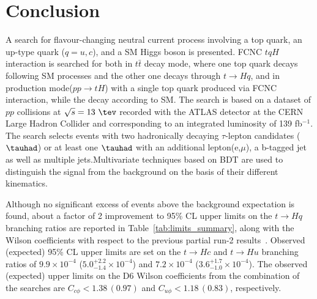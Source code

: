 \section{Conclusion}
\label{sec:conclusion}
A search for flavour-changing neutral current process involving a top quark, an up-type quark ($q=u, c$), and a SM Higgs boson is presented. FCNC $tqH$ interaction is searched for both in $t\bar{t}$ decay mode, where one top quark decays following SM processes and the other one decays through $t\rightarrow Hq$, and in production mode($pp\rightarrow tH$) with a single top quark produced via FCNC interaction, while the decay according to SM. The search is based on a dataset of $pp$ collisions at $\sqrt{s}=13~\tev$ recorded with the ATLAS detector at the CERN Large Hadron Collider and corresponding to an integrated luminosity of 139 fb$^{-1}$. The search selects events with two hadronically decaying $\tau$-lepton candidates ($\tauhad$) or at least one $\tauhad$ with an additional lepton(e,$\mu$), a b-tagged jet as well as multiple jets.Multivariate techniques based on BDT are used to distinguish the signal from the background on the basis of their different kinematics.


Although no significant excess of events above the background expectation is found, about a factor of 2 improvement to 95\% CL upper limits on the $t\to Hq$ branching ratios are reported in Table~\ref{tab:limits_summary}, along with the Wilson coefficients with respect to the previous partial run-2 results~\cite{Aaboud2019SearchFT}.
Observed (expected) 95\% CL upper limits are set on the $t\to Hc$ and $t\to Hu$ branching ratios of $9.9\times10^{-4}$ ($5.0^{+2.2}_{-1.4}\times10^{-4}$) and $7.2\times10^{-4}$ ($3.6^{+1.7}_{-1.0}\times10^{-4}$). The observed (expected) upper limits on the D6 Wilson coefficients from the combination of the searches are $C_{c\phi}<1.38\,(0.97)$ and $C_{u\phi}<1.18\,(0.83)$, respectively.
